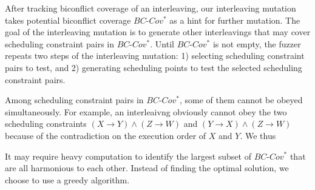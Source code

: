

\newcommand{\segment}{segment graph\xspace}
\newcommand{\segments}{segment graphs\xspace}
\newcommand{\Segments}{Segment graphs\xspace}


After tracking biconflict coverage of an interleaving, our
interleaving mutation takes potential biconflict coverage
$BC\mbox{-}Cov^*$ as a hint for further mutation.
%
The goal of the interleaving mutation is to generate other
interleavings that may cover scheduling constraint pairs in
$BC\mbox{-}Cov^*$.
%
Until $BC\mbox{-}Cov^*$ is not empty, the fuzzer repeats two steps of
the interleaving mutation:
%
1) selecting scheduling constraint pairs to test, and
2) generating scheduling points to test the selected scheduling
constraint pairs.


%
Among scheduling constraint pairs in $BC\mbox{-}Cov^*$, some of them
cannot be obeyed simultaneously.
%
For example, an interleaivng obviously cannot obey the two scheduling
constraints $(X \rightarrow Y)\wedge (Z \rightarrow W)$ and
$(Y \rightarrow X)\wedge (Z \rightarrow W)$ because of the
contradiction on the execution order of $X$ and $Y$.
%
We thus 


It may require heavy computation to identify the largest subset of
$BC\mbox{-}Cov^*$ that are all harmonious to each other.
%
Instead of finding the optimal solution, we choose to use a greedy
algorithm.
%


